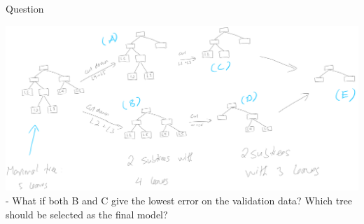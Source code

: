 \documentclass[
  ignorenonframetext,
]{beamer}
\begin{document}
\begin{frame}{Question}
\protect\hypertarget{question-1}{}

\includegraphics{images2/tree9.png} - What if both B and C give the
lowest error on the validation data? Which tree should be selected as
the final model?

\end{frame}
\end{document}
